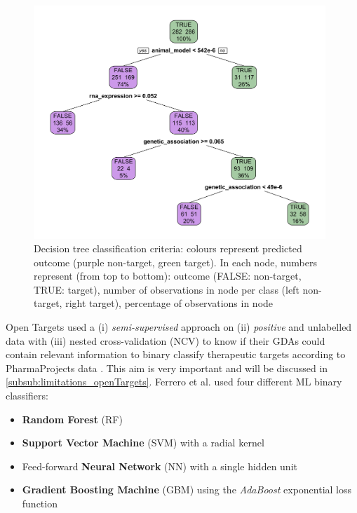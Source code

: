 \begin{figure}[H]
    \centering
    \includegraphics[width=11cm]{pics/DecisionTreeInf.png}
    \caption{Decision tree classification criteria: colours represent predicted outcome (purple non-target, green target). In each node, numbers represent (from top to bottom): outcome (FALSE: non-target, TRUE: target), number of observations in node per class (left non-target, right target), percentage of observations in node}
    \label{fig:OT_decisionTree}
\end{figure}

Open Targets used a (i) \emph{semi-supervised} approach on (ii) \emph{positive} and unlabelled data with (iii) nested cross-validation (NCV) to know if their GDAs could contain relevant information to binary classify therapeutic targets \cite{ferrero2017} according to PharmaProjects data \cite{pharmaProjects}. This aim is very important and will be discussed in \ref{subsub:limitations_openTargets}. Ferrero et al. used four different ML binary classifiers:
\begin{itemize}
    \item \textbf{Random Forest} (RF)
    \item \textbf{Support Vector Machine} (SVM) with a radial kernel
    \item Feed-forward \textbf{Neural Network} (NN) with a single hidden unit
    \item \textbf{Gradient Boosting Machine} (GBM) using the \emph{AdaBoost} exponential loss function
\end{itemize}

